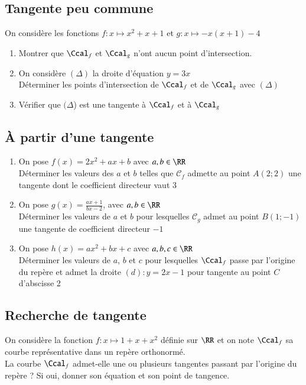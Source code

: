 \documentclass[oneside,12pt]{article}          %
\begin{document}
\subsection{Tangente peu commune}

On considère les fonctions $f:x\mapsto x^2+x+1$ et $g:x\mapsto-x (x + 1) - 4$

\begin{enumerate}
    \item Montrer que $\Ccal_f$ et $\Ccal_g$ n'ont aucun point d'intersection.
    \item On considère $(\Delta)$ la droite d'équation $y=3x$\\
		Déterminer les points d'intersection de $\Ccal_f$ et de $\Ccal_g$ avec $(\Delta)$  
	\item Vérifier que $(\Delta$) est une tangente à $\Ccal_f$ et à $\Ccal_g$
\end{enumerate}



\subsection{À partir d'une tangente}
\begin{enumerate}
    \item On pose $f(x)=2x^{2}+ax+b$ avec $a,b\in\RR$ \\
    Déterminer les valeurs des $a$ et $b$ telles que $\mathscr{C}_{f}$ admette au point $A(2;2)$ une tangente dont le coefficient directeur vaut $3$
    \item On pose $g(x)=\frac{ax+1}{bx-2}$, avec $a,b\in\RR$ \\
    Déterminer les valeurs de $a$ et $b$ pour lesquelles $\mathscr{C}_{g}$ admet au point $B(1;-1)$ une tangente de coefficient directeur $-1$
    \item On pose $h(x)=ax^2+bx+c$ avec $a,b,c\in\RR$\\
    Déterminer les valeurs de $a$, $b$ et $c$ pour lesquelles $\Ccal_f$ passe par l'origine du repère et admet la droite $(d):y=2x-1$ pour tangente au point $C$ d'abscisse 2
\end{enumerate}



\subsection{Recherche de tangente}
On considère la fonction $f:x\mapsto1+x+x^2$ définie sur $\RR$ et on note $\Ccal_f$ sa courbe représentative dans un repère orthonormé.\\
La courbe $\Ccal_f$ admet-elle une ou plusieurs tangentes passant par l'origine du repère ? Si  oui, donner son équation et son point de tangence.
\end{document}
